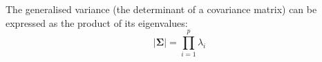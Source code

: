 \begin{theorem}
\label{th:eigenproduct}
The generalised variance (the determinant of a covariance matrix) can be expressed as the product of its eigenvalues:
\begin{equation}
\lvert \boldsymbol{\Sigma} \rvert = \prod_{i = 1}^{p} \lambda_{i}
\end{equation}
\end{theorem}